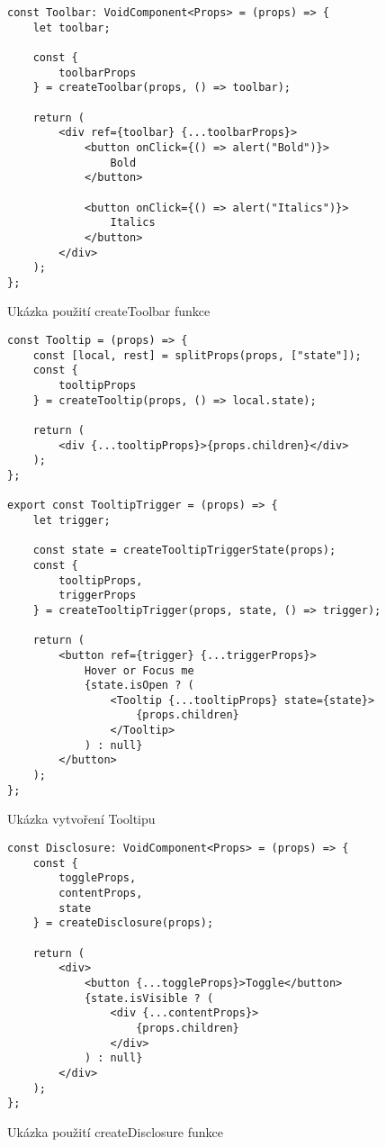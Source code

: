 \begin{listing}
    \begin{verbatim}
const Toolbar: VoidComponent<Props> = (props) => {
    let toolbar;

    const {
        toolbarProps
    } = createToolbar(props, () => toolbar);

    return (
        <div ref={toolbar} {...toolbarProps}>
            <button onClick={() => alert("Bold")}>
                Bold
            </button>

            <button onClick={() => alert("Italics")}>
                Italics
            </button>
        </div>
    );
};
\end{verbatim}
    \caption{Ukázka použití createToolbar funkce}
    \label{toolbar-example}
\end{listing}

\begin{listing}
    \begin{verbatim}
const Tooltip = (props) => {
    const [local, rest] = splitProps(props, ["state"]);
    const {
        tooltipProps
    } = createTooltip(props, () => local.state);
    
    return (
        <div {...tooltipProps}>{props.children}</div>
    );
};

export const TooltipTrigger = (props) => {
    let trigger;
    
    const state = createTooltipTriggerState(props);
    const {
        tooltipProps,
        triggerProps
    } = createTooltipTrigger(props, state, () => trigger);
    
    return (
        <button ref={trigger} {...triggerProps}>
            Hover or Focus me
            {state.isOpen ? (
                <Tooltip {...tooltipProps} state={state}>
                    {props.children}
                </Tooltip>
            ) : null}
        </button>
    );
};
\end{verbatim}
    \caption{Ukázka vytvoření Tooltipu}
    \label{tooltip-example}
\end{listing}

\begin{listing}
    \begin{verbatim}
const Disclosure: VoidComponent<Props> = (props) => {
    const {
        toggleProps,
        contentProps,
        state
    } = createDisclosure(props);

    return (
        <div>
            <button {...toggleProps}>Toggle</button>
            {state.isVisible ? (
                <div {...contentProps}>
                    {props.children}
                </div>
            ) : null}
        </div>
    );
};
\end{verbatim}
    \caption{Ukázka použití createDisclosure funkce}
    \label{disclosure-example}
\end{listing}

